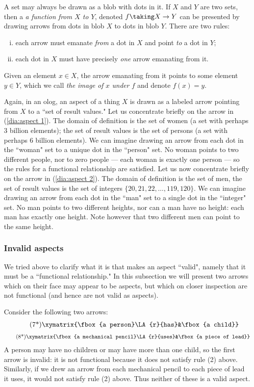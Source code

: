 A set may always be drawn as a blob with dots in it. If $X$ and $Y$ are two sets, then a {\em a function from $X$ to $Y$}, denoted $f\taking X\to Y$ can be presented by drawing arrows from dots in blob $X$ to dots in blob $Y$. There are two rules: \begin{enumerate}[(i)]\item each arrow must emanate {\em from} a dot in $X$ and point {\em to} a dot in $Y$;\item each dot in $X$ must have precisely {\em one} arrow emanating from it.\end{enumerate}  Given an element $x\in X$, the arrow emanating from it points to some element $y\in Y$, which we call {\em the image of $x$ under $f$} and denote $f(x)=y$. 

Again, in an olog, an aspect of a thing $X$ is drawn as a labeled arrow pointing from $X$ to a ``set of result values."   Let us concentrate briefly on the arrow in (\ref{dia:aspect 1}). The domain of definition is the set of women (a set with perhaps 3 billion elements); the set of result values is the set of persons (a set with perhaps 6 billion elements).  We can imagine drawing an arrow from each dot in the ``woman" set to a unique dot in the ``person" set.  No woman points to two different people, nor to zero people --- each woman is exactly one person --- so the rules for a functional relationship are satisfied. Let us now concentrate briefly on the arrow in (\ref{dia:aspect 2}). The domain of definition is the set of men, the set of result values is the set of integers $\{20,21,22,\ldots,119,120\}$. We can imagine drawing an arrow from each dot in the ``man" set to a single dot in the ``integer" set. No man points to two different heights, nor can a man have no height: each man has exactly one height. Note however that two different men can point to the same height.

\subsubsection{Invalid aspects}

We tried above to clarify what it is that makes an aspect ``valid", namely that it must be a ``functional relationship."  In this subsection we will present two arrows which on their face may appear to be aspects, but which on closer inspection are not functional (and hence are not valid as aspects). 
 
Consider the following two arrows: \begin{align}\tag{7*}\xymatrix{\fbox{a person}\LA{r}{has}&\fbox{a child}}\end{align}\vspace{-.13in}\begin{align}\tag{8*}\xymatrix{\fbox{a mechanical pencil}\LA{r}{uses}&\fbox{a piece of lead}}\end{align}\setcounter{equation}{8}  A person may have no children or may have more than one child, so the first arrow is invalid: it is not functional because it does not satisfy rule (2) above. Similarly, if we drew an arrow from each mechanical pencil to each piece of lead it uses, it would not satisfy rule (2) above. Thus neither of these is a valid aspect.

